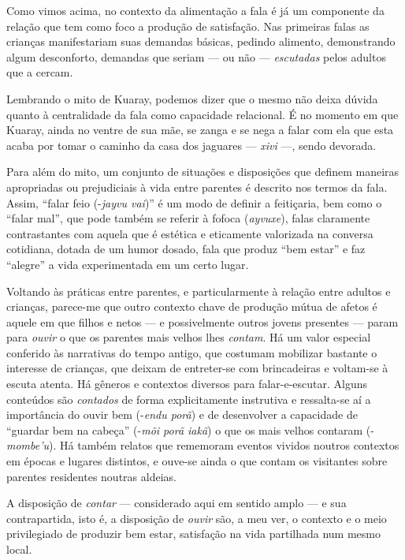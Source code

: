 Como vimos acima, no contexto da alimentação a fala é já um componente
da relação que tem como foco a produção de satisfação. Nas primeiras
falas as crianças manifestariam suas demandas básicas, pedindo alimento,
demonstrando algum desconforto, demandas que seriam --- ou não ---
\emph{escutadas} pelos adultos que a cercam.

Lembrando o mito de Kuaray, podemos dizer que o mesmo não deixa dúvida
quanto à centralidade da fala como capacidade relacional. É no momento
em que Kuaray, ainda no ventre de sua mãe, se zanga e se nega a falar
com ela que esta acaba por tomar o caminho da casa dos jaguares ---
\emph{xivi} ---, sendo devorada.

Para além do mito, um conjunto de situações e disposições que definem
maneiras apropriadas ou prejudiciais à vida entre parentes é descrito
nos termos da fala. Assim, ``falar feio (-\emph{jayvu vai})'' é um modo
de definir a feitiçaria, bem como o ``falar mal'', que pode também se
referir à fofoca (\emph{ayvuxe}), falas claramente contrastantes com
aquela que é estética e eticamente valorizada na conversa cotidiana,
dotada de um humor dosado, fala que produz ``bem estar'' e faz
``alegre'' a vida experimentada em um certo lugar.

Voltando às práticas entre parentes, e particularmente à relação entre
adultos e crianças, parece-me que outro contexto chave de produção mútua
de afetos é aquele em que filhos e netos --- e possivelmente outros
jovens presentes --- param para \emph{ouvir} o que os parentes mais
velhos lhes \emph{contam}. Há um valor especial conferido às narrativas
do tempo antigo, que costumam mobilizar bastante o interesse de
crianças, que deixam de entreter-se com brincadeiras e voltam-se à
escuta atenta. Há gêneros e contextos diversos para falar-e-escutar.
Alguns conteúdos são \emph{contados} de forma explicitamente instrutiva
e ressalta-se aí a importância do ouvir bem (-\emph{endu porã}) e de
desenvolver a capacidade de ``guardar bem na cabeça'' (-\emph{mõi porã
iakã}) o que os mais velhos contaram (-\emph{mombe'u}). Há também
relatos que rememoram eventos vividos noutros contextos em épocas e
lugares distintos, e ouve-se ainda o que contam os visitantes sobre
parentes residentes noutras aldeias.

A disposição de \emph{contar} --- considerado aqui em sentido amplo ---
e sua contrapartida, isto é, a disposição de \emph{ouvir} são, a meu
ver, o contexto e o meio privilegiado de produzir bem estar, satisfação
na vida partilhada num mesmo local.


